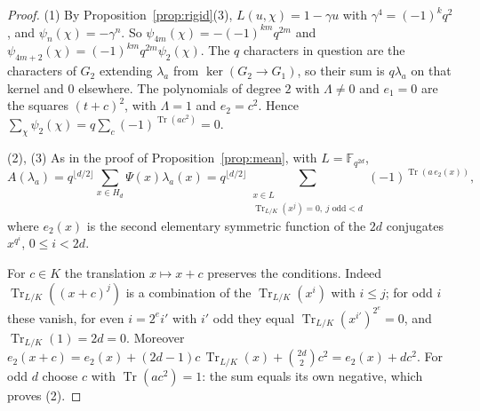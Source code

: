 \documentclass[11pt,a4paper]{amsart}
\theoremstyle{definition}
\theoremstyle{remark}
\newcommand{\F}{\mathbb{F}}
\newcommand{\Tr}{\operatorname{Tr}}
\begin{document}
\begin{proof}
(1) By Proposition~\ref{prop:rigid}(3), $L(u,\chi)=1-\gamma u$ with $\gamma^4=(-1)^kq^2$, and
$\psi_n(\chi)=-\gamma^n$. So $\psi_{4m}(\chi)=-(-1)^{km}q^{2m}$ and
$\psi_{4m+2}(\chi)=(-1)^{km}q^{2m}\psi_2(\chi)$. The $q$ characters in question are the characters of $G_2$
extending $\lambda_a$ from $\ker(G_2\to G_1)$, so their sum is $q\lambda_a$ on that kernel and $0$ elsewhere. The
polynomials of degree $2$ with $\Lambda\ne0$ and $e_1=0$ are the squares $(t+c)^2$, with $\Lambda=1$ and $e_2=c^2$.
Hence $\sum_\chi\psi_2(\chi)=q\sum_c(-1)^{\Tr(ac^2)}=0$.

(2), (3) As in the proof of Proposition~\ref{prop:mean}, with $L=\F_{q^{2d}}$,
\[
A(\lambda_a)=q^{\lfloor d/2\rfloor}\sum_{x\in H_d}\Psi(x)\lambda_a(x)
=q^{\lfloor d/2\rfloor}\sum_{\substack{x\in L\\ \Tr_{L/K}(x^j)=0,\ j\text{ odd}<d}}(-1)^{\Tr(a\,e_2(x))},
\]
where $e_2(x)$ is the second elementary symmetric function of the $2d$ conjugates $x^{q^i}$, $0\le i<2d$.

For $c\in K$ the translation $x\mapsto x+c$ preserves the conditions. Indeed $\Tr_{L/K}((x+c)^j)$ is a combination of
the $\Tr_{L/K}(x^i)$ with $i\le j$; for odd $i$ these vanish, for even $i=2^ei'$ with $i'$ odd they equal
$\Tr_{L/K}(x^{i'})^{2^e}=0$, and $\Tr_{L/K}(1)=2d=0$. Moreover
$e_2(x+c)=e_2(x)+(2d-1)c\,\Tr_{L/K}(x)+\binom{2d}2c^2=e_2(x)+dc^2$. For odd $d$ choose $c$ with $\Tr(ac^2)=1$: the
sum equals its own negative, which proves (2).


\end{proof}
\end{document}
